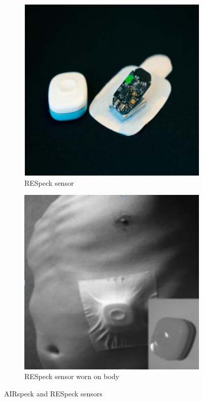 \begin{figure}[H]
\medskip

\begin{subfigure}{0.48\textwidth}
\includegraphics[width=\linewidth]{images/RESpeck.png}
\caption{RESpeck sensor \cite{estimation_dosage}} \label{fig:e}
\end{subfigure}
\begin{subfigure}{0.48\textwidth}
\includegraphics[width=\linewidth]{images/RESpeck_worn.png}
\caption{RESpeck sensor worn on body \cite{estimation_dosage}} \label{fig:f}
\end{subfigure}

\caption{AIRspeck and RESpeck sensors}
\label{fig:sensors}
\end{figure}



